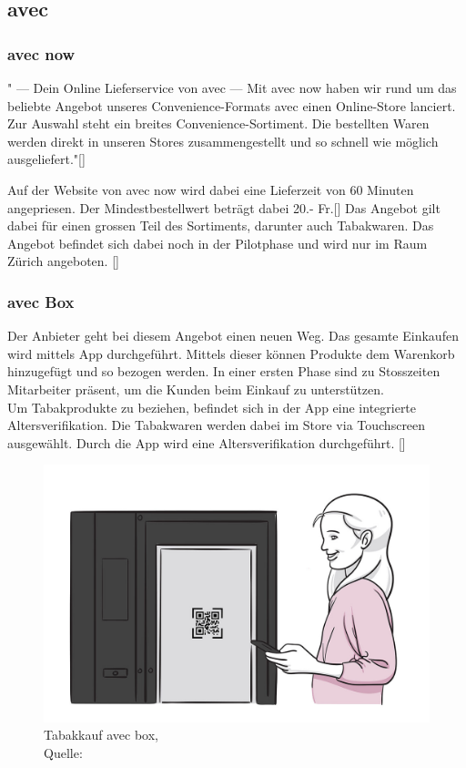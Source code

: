 \subsection{avec}
\subsubsection{avec now}
" — Dein Online Lieferservice von avec —
 Mit avec now haben wir rund um das beliebte Angebot unseres Convenience-Formats avec einen Online-Store lanciert.
 Zur Auswahl steht ein breites Convenience-Sortiment. Die bestellten Waren werden direkt in unseren Stores zusammengestellt und so schnell wie möglich ausgeliefert."[\cite{avecNow}]
 
 Auf der Website von avec now wird dabei eine Lieferzeit von 60 Minuten angepriesen. Der Mindestbestellwert beträgt dabei 20.- Fr.[\cite{avecNowMain}]
 Das Angebot gilt dabei für einen grossen Teil des Sortiments, darunter auch Tabakwaren. Das Angebot befindet sich dabei noch in der Pilotphase und wird nur im Raum Zürich angeboten. [\cite{avecNowShipping}]
 
 \subsubsection{avec Box}\label{avecBox}
 Der Anbieter geht bei diesem Angebot einen neuen Weg. Das gesamte Einkaufen wird mittels App durchgeführt. Mittels dieser können Produkte dem Warenkorb hinzugefügt und so bezogen werden. In einer ersten Phase sind zu Stosszeiten Mitarbeiter präsent, um die Kunden beim Einkauf zu unterstützen.  \\
 Um Tabakprodukte zu beziehen, befindet sich in der App eine integrierte Altersverifikation. Die Tabakwaren werden dabei im Store via Touchscreen ausgewählt. Durch die App wird eine Altersverifikation durchgeführt. [\cite{avecBoxTabak}]
 \begin{figure}[H]
 	\centering
 	\includegraphics[width=1\textwidth]{images/tabakkaufAvecBox.jpg}
 	\caption[Tabakkauf avec box]{Tabakkauf avec box,\\ Quelle: \cite{avecBoxTabak}}
 	\label{img: avec box tabakkauf}
 \end{figure}
 

